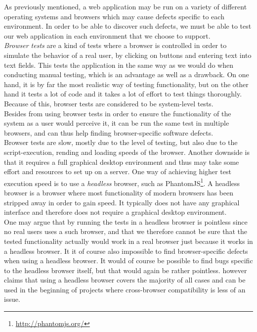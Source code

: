 As previously mentioned, a web application may be run on a variety of
different operating systems and browsers which may cause defects
specific to each environment. In order to be able to discover such
defects, we must be able to test our web application in each environment
that we choose to support.\\

\emph{Browser tests} are a kind of tests where a browser is controlled
in order to simulate the behavior of a real user, by clicking on buttons
and entering text into text fields. This tests the application in the
same way as we would do when conducting manual testing, which is an
advantage as well as a drawback. On one hand, it is by far the most
realistic way of testing functionality, but on the other hand it tests a
lot of code and it takes a lot of effort to test things thoroughly.
Because of this, browser tests are considered to be system-level
tests.\\

Besides from using browser tests in order to ensure the functionality of
the system as a user would perceive it, it can be run the same test in
multiple browsers, and can thus help finding browser-specific software
defects.\\

Browser tests are slow, mostly due to the level of testing, but also due
to the script-execution, rending and loading speeds of the browser.
Another downside is that it requires a full graphical desktop
environment and thus may take some effort and resources to set up on a
server. One way of achieving higher test execution speed is to use a
\emph{headless} browser, such as
PhantomJS\footnote{\url{http://phantomjs.org/}}. A headless browser is a
browser where most functionality of modern browsers has been stripped
away in order to gain speed. It typically does not have any graphical
interface and therefore does not require a graphical desktop
environment.\cite{web:headless}\\

One may argue that by running the tests in a headless browser is
pointless since no real users uses a such browser, and that we therefore
cannot be sure that the tested functionality actually would work in a
real browser just because it works in a headless browser. It it of
course also impossible to find browser-specific defects when using  a
headless browser. It would of course be possible to find bugs specific
to the headless browser itself, but that would again be rather
pointless. \citet{web:headless} however claims that using a headless
browser covers the majority of all cases and can be used in the
beginning of projects where cross-browser compatibility is less of an
issue.\\


